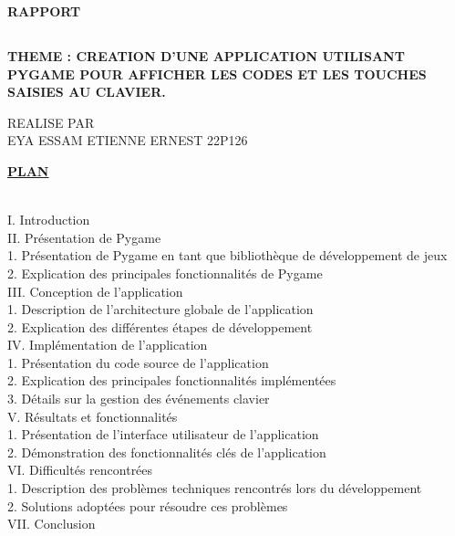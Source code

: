 \documentclass[a4paper, 12px]{article}
\begin{document}

\begin{center}
\Huge  {\bfseries RAPPORT} \\

\begin{mybox}
\section*{}
   \bfseries  {\huge THEME : CREATION D'UNE APPLICATION UTILISANT PYGAME POUR AFFICHER LES CODES ET LES TOUCHES SAISIES AU CLAVIER.}
\\
\end{mybox}


\large REALISE PAR\\

\LARGE EYA ESSAM ETIENNE ERNEST 22P126\\

\end{center}



\newpage



\Large {\bfseries \underline{PLAN}\\
\\
\normalsize

I.	Introduction\\
II.	Présentation de Pygame\\
1.	Présentation de Pygame en tant que bibliothèque de développement de jeux\\
2.	Explication des principales fonctionnalités de Pygame\\
III.	Conception de l'application\\
1.	Description de l'architecture globale de l'application\\
2.	Explication des différentes étapes de développement\\
IV.	Implémentation de l'application\\
1.	Présentation du code source de l'application\\
2.	Explication des principales fonctionnalités implémentées\\
3.	Détails sur la gestion des événements clavier\\
V.	Résultats et fonctionnalités\\
1.	Présentation de l'interface utilisateur de l'application\\
2.	Démonstration des fonctionnalités clés de l'application\\
VI.	Difficultés rencontrées\\
1.	Description des problèmes techniques rencontrés lors du développement\\
2.	Solutions adoptées pour résoudre ces problèmes\\
VII.	Conclusion}\\
\\
\\
\newpage
\end{document}
